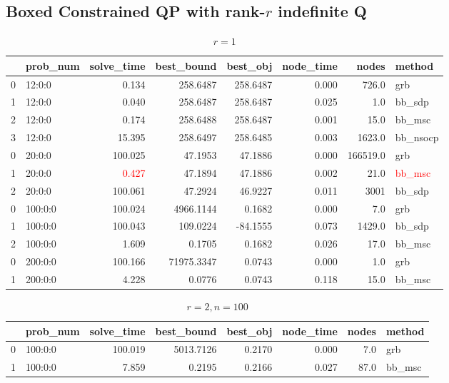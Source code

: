 \documentclass[a4paper, 10pt]{article}
\newcommand{\red}[1]{\textcolor{red}{#1}}
\begin{document}
\subsection{Boxed Constrained QP with rank-\(r\) indefinite Q}
\scriptsize
\begin{table}[h!]
    \begin{tabular}{llrrrrrl}
        \toprule
        {} & prob\_num & solve\_time & best\_bound & best\_obj & node\_time & nodes    & method        \\
        \midrule
        0  & 12:0:0    & 0.134       & 258.6487    & 258.6487  & 0.000      & 726.0    & grb           \\
        1  & 12:0:0    & 0.040       & 258.6487    & 258.6487  & 0.025      & 1.0      & bb\_sdp       \\
        2  & 12:0:0    & 0.174       & 258.6488    & 258.6487  & 0.001      & 15.0     & bb\_msc       \\
        3  & 12:0:0    & 15.395      & 258.6497    & 258.6485  & 0.003      & 1623.0   & bb\_nsocp     \\
        \midrule
        0  & 20:0:0    & 100.025     & 47.1953     & 47.1886   & 0.000      & 166519.0 & grb           \\
        1  & 20:0:0    & \red{0.427} & 47.1894     & 47.1886   & 0.002      & 21.0     & \red{bb\_msc} \\
        2  & 20:0:0    & 100.061     & 47.2924     & 46.9227   & 0.011      & 3001     & bb\_sdp       \\
        \midrule
        0  & 100:0:0   & 100.024     & 4966.1144   & 0.1682    & 0.000      & 7.0      & grb           \\
        1  & 100:0:0   & 100.043     & 109.0224    & -84.1555  & 0.073      & 1429.0   & bb\_sdp       \\
        2  & 100:0:0   & 1.609       & 0.1705      & 0.1682    & 0.026      & 17.0     & bb\_msc       \\
        \midrule
        0  & 200:0:0   & 100.166     & 71975.3347  & 0.0743    & 0.000      & 1.0      & grb           \\
        1  & 200:0:0   & 4.228       & 0.0776      & 0.0743    & 0.118      & 15.0     & bb\_msc       \\
        \bottomrule
    \end{tabular}
    \caption{\(r=1\)}

\end{table}
\begin{table}[h!]
    \begin{tabular}{llrrrrrl}
        \toprule
        {} & prob\_num & solve\_time & best\_bound & best\_obj & node\_time & nodes & method  \\
        \midrule
        0  & 100:0:0   & 100.019     & 5013.7126   & 0.2170    & 0.000      & 7.0   & grb     \\
        1  & 100:0:0   & 7.859       & 0.2195      & 0.2166    & 0.027      & 87.0  & bb\_msc \\
        \bottomrule
    \end{tabular}
    \caption{\(r=2, n=100\)}
\end{table}
\end{document}
